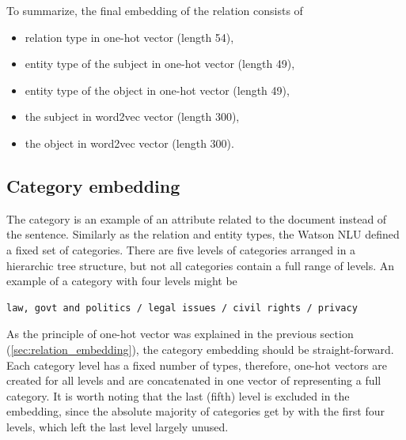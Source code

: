 \documentclass[
  digital, %
  notable,   %
  nolof,     %
  nolot,     %
]{fithesis3}
\begin{document}
To summarize, the final embedding of the relation consists of
\begin{itemize}
\item relation type in one-hot vector (length 54),
\item entity type of the subject in one-hot vector (length 49),
\item entity type of the object in one-hot vector (length 49),
\item the subject in word2vec vector (length 300),
\item the object in word2vec vector (length 300).
\end{itemize}


\subsection{Category embedding}
The category is an example of an attribute related to the document instead of the sentence.
Similarly as the relation and entity types, the Watson NLU defined a fixed set of categories.
There are five levels of categories arranged in a hierarchic tree structure, but not all categories contain a full range of levels.
An example of a category with four levels might be
\begin{verbatim}
law, govt and politics / legal issues / civil rights / privacy
\end{verbatim}

As the principle of one-hot vector was explained in the previous section (\ref{sec:relation_embedding}), the category embedding should be straight-forward.
Each category level has a fixed number of types, therefore, one-hot vectors are created for all levels and are concatenated in one vector of representing a full category.
It is worth noting that the last (fifth) level is excluded in the embedding, since the absolute majority of categories get by with the first four levels, which left the last level largely unused.
\end{document}
